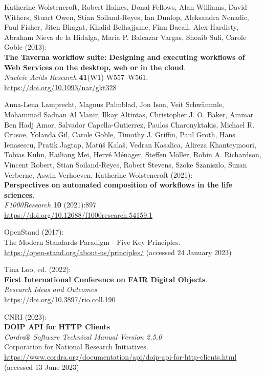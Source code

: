 \begin{thebibliography}{9}
Katherine Wolstencroft, Robert Haines, Donal Fellows, Alan Williams,
David Withers, Stuart Owen, Stian Soiland-Reyes, Ian Dunlop, Aleksandra
Nenadic, Paul Fisher, Jiten Bhagat, Khalid Belhajjame, Finn Bacall, Alex
Hardisty, Abraham Nieva de la Hidalga, Maria P. Balcazar Vargas, Shoaib
Sufi, Carole Goble (2013): \\
\textbf{The {Taverna} workflow suite: Designing
and executing workflows of {Web Services} on the desktop, web or in the
cloud}. \\
\emph{Nucleic Acids Research} \textbf{41}(W1) W557--W561.\\
\url{https://doi.org/10.1093/nar/gkt328}

Anna-Lena Lamprecht, Magnus Palmblad, Jon Ison, Veit Schwämmle, Mohammad
Sadnan Al Manir, Ilkay Altintas, Christopher J. O. Baker, Ammar Ben Hadj
Amor, Salvador Capella-Gutierrez, Paulos Charonyktakis, Michael R.
Crusoe, Yolanda Gil, Carole Goble, Timothy J. Griffin, Paul Groth, Hans
Ienasescu, Pratik Jagtap, Matúš Kalaš, Vedran Kasalica, Alireza
Khanteymoori, Tobias Kuhn, Hailiang Mei, Hervé Ménager, Steffen Möller,
Robin A. Richardson, Vincent Robert, Stian Soiland-Reyes, Robert
Stevens, Szoke Szaniszlo, Suzan Verberne, Aswin Verhoeven, Katherine
Wolstencroft (2021): \\
\textbf{Perspectives on automated composition of workflows
in the life sciences}. \\
\emph{F1000Research} \textbf{10} (2021):897 \\
\url{https://doi.org/10.12688/f1000research.54159.1}

OpenStand (2017): \\
The {Modern Standards Paradigm} - {Five Key Principles}.\\
\url{https://open-stand.org/about-us/principles/} (accessed 24 January
2023)

Tina Loo, ed. (2022): \\
\textbf{First International Conference on FAIR Digital Objects}.\\
\emph{Research Ideas and Outcomes}\\
\url{https://doi.org/10.3897/rio.coll.190}

CNRI (2023): \\
\textbf{DOIP API for HTTP Clients} \\
\emph{Cordra® Software Technical Manual Version 2.5.0}\\
Corporation for National Research Initiatives.
\url{https://www.cordra.org/documentation/api/doip-api-for-http-clients.html}
(accessed 13 June 2023)


\end{thebibliography}
